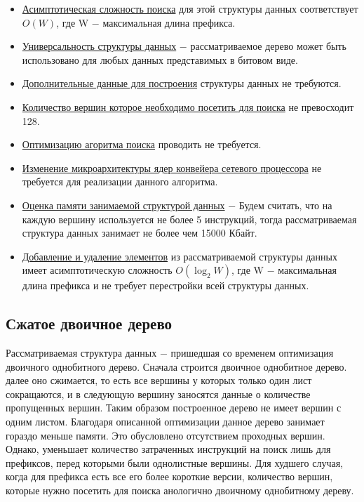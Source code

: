 \documentclass[a4peper, 12pt, titlepage, finall]{report}
\begin{document}
            \begin{itemize}
                \item\underline{Асимптотическая сложность поиска} для этой структуры данных соответствует {\ttfamily $O(W)$},
                где {\ttfamily W} $-$ максимальная длина префикса.
                \item\underline{Универсальность структуры данных} $-$ рассматриваемое дерево может быть использовано для любых данных представимых в битовом виде.
                \item\underline{Дополнительные данные для построения} структуры данных не требуются.
                \item\underline{Количество вершин которое необходимо посетить для поиска} не превосходит 128.
                \item\underline{Оптимизацию агоритма поиска} проводить не требуется.
                \item\underline{Изменение микроархитектуры ядер конвейера сетевого процессора} не требуется для реализации данного алгоритма.
                \item\underline{Оценка памяти занимаемой структурой данных} $-$ Будем считать, что на каждую вершину используется не более 5 инструкций,
                тогда рассматриваемая структура данных занимает не более чем 15000 Кбайт.
                \item\underline{Добавление и удаление элементов} из рассматриваемой структуры данных имеет асимптотическую сложность 
            {\ttfamily $O(\log_2{W})$}, где {\ttfamily W} $-$ максимальная длина префикса и не требует перестройки всей структуры данных.\\
            \end{itemize}

        \subsection{Сжатое двоичное дерево}
            Рассматриваемая структура данных $-$ пришедшая со временем оптимизация двоичного однобитного дерево. Сначала строится двоичное однобитное дерево.
            далее оно сжимается, то есть все вершины у которых только один лист сокращаются, и в следующую вершину заносятся данные о 
            количестве пропущенных вершин. Таким образом построенное дерево не имеет вершин с одним листом. Благодаря описанной оптимизации данное дерево
            занимает гораздо меньше памяти. Это обусловлено отсутствием проходных вершин. Однако, уменьшает количество затраченных инструкций на поиск лишь 
            для префиксов, перед которыми были однолистные вершины. Для худшего случая, когда для префикса есть все его более короткие версии, количество вершин, 
            которые нужно посетить для поиска анологично двоичному однобитному дереву.
\end{document}
